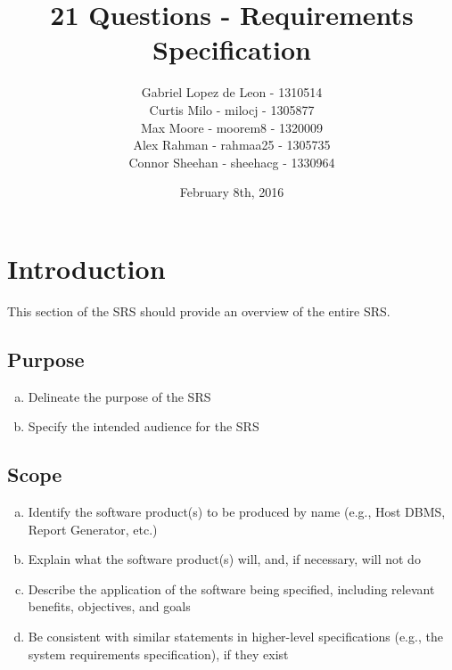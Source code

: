 \documentclass[titlepage]{article}
\title{\textbf{21 Questions - Requirements Specification}}
\author{Gabriel Lopez de Leon - 1310514\\Curtis Milo - milocj - 1305877\\Max Moore - moorem8 - 1320009\\Alex Rahman - rahmaa25 - 1305735\\Connor Sheehan - sheehacg - 1330964}
\date{February 8th, 2016}
\begin{document}
	
	\maketitle
	\vspace{4cm}	
		\newpage
		\tableofcontents
		\newpage
		\section{Introduction}
		\label{sec:introduction}
		
		This section of the SRS should provide an overview of the entire SRS.
		
		\subsection{Purpose}
		\label{sub:purpose}
		\begin{enumerate}[a)]
			\item Delineate the purpose of the SRS
			\item Specify the intended audience for the SRS
		\end{enumerate}
		
		\subsection{Scope}
		\label{sub:scope}
		\begin{enumerate}[a)]
			\item Identify the software product(s) to be produced by name (e.g., Host DBMS, Report Generator, etc.)
			\item Explain what the software product(s) will, and, if necessary, will not do
			\item Describe the application of the software being specified, including relevant benefits, objectives, and goals
			\item Be consistent with similar statements in higher-level specifications (e.g., the system requirements specification), if they exist
		\end{enumerate}
		
\end{document}
